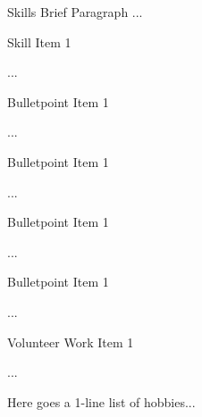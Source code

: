 \documentclass{template}
\begin{document}
\header


\begin{skills}{Skills Brief Paragraph ...}
    \item Skill Item 1
    \item ...
\end{skills}

\begin{employmenthistory}
\begin{bulletpoints}
    \item Bulletpoint Item 1
    \item ...
\end{bulletpoints}

\begin{bulletpoints}
    \item Bulletpoint Item 1
    \item ...
\end{bulletpoints}
\begin{bulletpoints}
    \item Bulletpoint Item 1
    \item ...
\end{bulletpoints}

\begin{bulletpoints}
    \item Bulletpoint Item 1
    \item ...
\end{bulletpoints}
\end{employmenthistory}

\begin{volunteerwork}
    \item Volunteer Work Item 1
    \item ...
\end{volunteerwork}

\begin{hobbies}
    Here goes a 1-line list of hobbies...
\end{hobbies}
\end{document}
